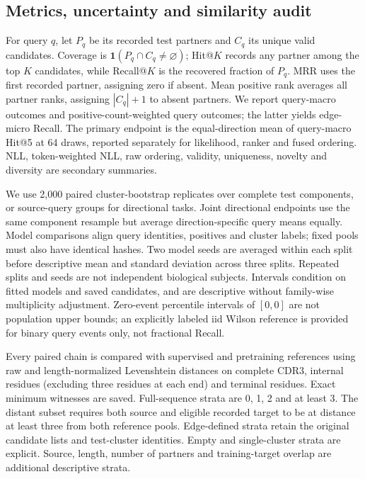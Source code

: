 \documentclass[10pt]{article}
\begin{document}
\subsection{Metrics, uncertainty and similarity audit}
For query $q$, let $P_q$ be its recorded test partners and $C_q$ its unique valid
candidates. Coverage is $\mathbf{1}(P_q\cap C_q\ne\varnothing)$; Hit@$K$ records
any partner among the top $K$ candidates, while Recall@$K$ is the recovered
fraction of $P_q$. MRR uses the first recorded partner, assigning zero if absent.
Mean positive rank averages all partner ranks, assigning $|C_q|+1$ to absent
partners. We report query-macro outcomes and positive-count-weighted query
outcomes; the latter yields edge-micro Recall. The primary endpoint is the
equal-direction mean of query-macro Hit@5 at 64 draws, reported separately for
likelihood, ranker and fused ordering. NLL, token-weighted NLL, raw ordering,
validity, uniqueness, novelty and diversity are secondary summaries.

We use 2,000 paired cluster-bootstrap replicates over complete test components,
or source-query groups for directional tasks. Joint directional endpoints use
the same component resample but average direction-specific query means equally.
Model comparisons align query identities, positives and cluster labels; fixed
pools must also have identical hashes. Two model seeds are averaged within each
split before descriptive mean and standard deviation across three splits.
Repeated splits and seeds are not independent biological subjects. Intervals
condition on fitted models and saved candidates, and are descriptive without
family-wise multiplicity adjustment. Zero-event percentile intervals of $[0,0]$
are not population upper bounds; an explicitly labeled iid Wilson reference is
provided for binary query events only, not fractional Recall.

Every paired chain is compared with supervised and pretraining references using
raw and length-normalized Levenshtein distances on complete CDR3, internal
residues (excluding three residues at each end) and terminal residues. Exact
minimum witnesses are saved. Full-sequence strata are 0, 1, 2 and at least 3.
The distant subset requires both source and eligible recorded target to be at
distance at least three from both reference pools. Edge-defined strata retain
the original candidate lists and test-cluster identities. Empty and single-cluster
strata are explicit. Source, length, number of partners and training-target
overlap are additional descriptive strata.
\end{document}
